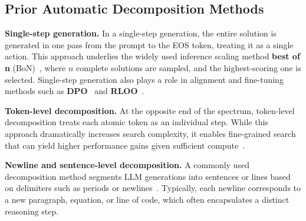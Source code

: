 \vskip -0.1in
\subsection{Prior Automatic Decomposition Methods}
\label{sec:prior_decomp}

\textbf{Single-step generation.}  
In a single-step generation, the entire solution is generated in one pass from the prompt to the \textsc{EOS} token, treating it as a single action. This approach underlies the widely used inference scaling method \textbf{best of n} (BoN)~\citep{cobbe2021training, lightman2023let, snell2024scaling, liang2024improving}, where $n$ complete solutions are sampled, and the highest-scoring one is selected. Single-step generation also plays a role in alignment and fine-tuning methods such as \textbf{DPO}~\citep{rafailov2024direct} and \textbf{RLOO}~\citep{ahmadian2024back}.

\textbf{Token-level decomposition.}  
At the opposite end of the spectrum, token-level decomposition treats each atomic token as an individual step. While this approach dramatically increases search complexity, it enables fine-grained search that can yield higher performance gains given sufficient compute~\citep{feng2023alphazero}.

\textbf{Newline and sentence-level decomposition.}  
A commonly used decomposition method segments LLM generations into sentences or lines based on delimiters such as periods or newlines~\citep{hao2023reasoning, feng2023alphazero, yao2024tree}. Typically, each newline corresponds to a new paragraph, equation, or line of code, which often encapsulates a distinct reasoning step.




